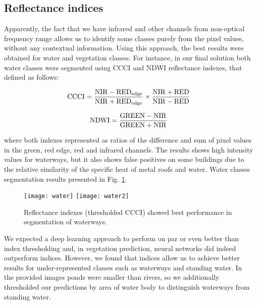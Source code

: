 \documentclass[10pt,twocolumn,letterpaper]{article}
\begin{document}
\subsection{Reflectance indices}
\label{subsec:reflectance}

Apparently, the fact that we have infrared and other channels from non-optical frequency range allows us to identify some classes purely from the pixel values, without any contextual information. Using this approach, the best results were obtained for water and vegetation classes. For instance, in our final solution both water classes were segmented using CCCI \cite{ccci} and NDWI reflectance indexes, that defined as follows:

\begin{equation}
{\rm CCCI} = \frac{{\rm NIR} - {\rm RED}_{\rm edge}}{{\rm NIR} + {\rm RED}_{\rm edge}}\times{\frac{{\rm NIR} + {\rm RED}}{{\rm NIR} - {\rm RED}}}
\end{equation} 

\begin{equation}
{\rm NDWI} = \frac{{\rm GREEN} - {\rm NIR}}{{\rm GREEN} + {\rm NIR}}
\end{equation} 

\noindent where both indexes represented as ratios of the difference and sum of pixel values in the green, red edge, red and infrared channels. The results shows high intensity values for waterways, but it also shows false positives on some buildings due to the relative similarity of the specific heat of metal roofs and water. Water classes segmentation results presented in Fig. \ref{fig:ccci}.

\begin{figure}[!h]
	\captionsetup{justification=centering}
	\centering
	\texttt{[image: water]}
	\texttt{[image: water2]}
	\caption{ Reflectance indexes (thresholded CCCI) showed best performance in segmentation of waterways.}
	\label{fig:ccci}
\end{figure}

We expected a deep learning approach to perform on par or even better than index thresholding and, in vegetation prediction, neural networks did indeed outperform indices. However, we found that indices allow us to achieve better results for under-represented classes such as waterways and standing water. In the provided images ponds were smaller than rivers, so we additionally thresholded our predictions by area of water body to distinguish waterways from standing water.
\end{document}
